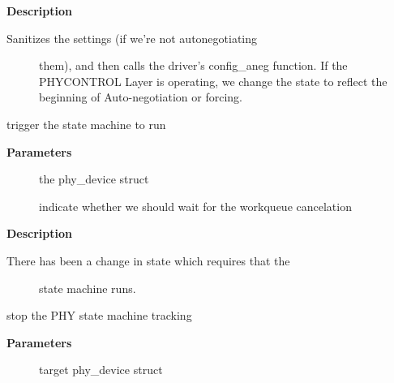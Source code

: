 \documentclass[a4paper,8pt,english]{sphinxmanual}
\begin{document}
\textbf{Description}
\begin{description}
\item[{Sanitizes the settings (if we're not autonegotiating}] \leavevmode
them), and then calls the driver's config\_aneg function.
If the PHYCONTROL Layer is operating, we change the state to
reflect the beginning of Auto-negotiation or forcing.

\end{description}

\begin{fulllineitems}
\label{networking/kapi:c.phy_trigger_machine}
trigger the state machine to run

\end{fulllineitems}


\textbf{Parameters}
\begin{description}
\item[{}] \leavevmode
the phy\_device struct

\item[{}] \leavevmode
indicate whether we should wait for the workqueue cancelation

\end{description}

\textbf{Description}
\begin{description}
\item[{There has been a change in state which requires that the}] \leavevmode
state machine runs.

\end{description}

\begin{fulllineitems}
\label{networking/kapi:c.phy_stop_machine}
stop the PHY state machine tracking

\end{fulllineitems}


\textbf{Parameters}
\begin{description}
\item[{}] \leavevmode
target phy\_device struct

\end{description}
\end{document}
